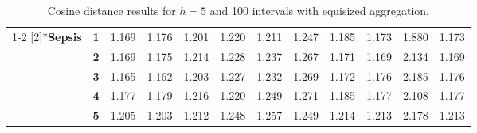 \begin{table}[htbp]
\begin{tabular}{|cl|rrrrrrrrrr|}
\cmidrule{1-2}    \multirow{5}[2]{*}{\textbf{Sepsis}} & \textbf{1} & \cellcolor[rgb]{ .851,  .851,  .851}1.169 & \cellcolor[rgb]{ .851,  .851,  .851}1.176 & \cellcolor[rgb]{ .847,  .847,  .847}1.201 & \cellcolor[rgb]{ .843,  .843,  .843}1.220 & \cellcolor[rgb]{ .843,  .843,  .843}1.211 & \cellcolor[rgb]{ .835,  .835,  .835}1.247 & \cellcolor[rgb]{ .847,  .847,  .847}1.185 & \cellcolor[rgb]{ .851,  .851,  .851}1.173 & \cellcolor[rgb]{ .714,  .714,  .714}1.880 & \cellcolor[rgb]{ .851,  .851,  .851}1.173 \\
          & \textbf{2} & \cellcolor[rgb]{ .851,  .851,  .851}1.169 & \cellcolor[rgb]{ .851,  .851,  .851}1.175 & \cellcolor[rgb]{ .843,  .843,  .843}1.214 & \cellcolor[rgb]{ .839,  .839,  .839}1.228 & \cellcolor[rgb]{ .839,  .839,  .839}1.237 & \cellcolor[rgb]{ .831,  .831,  .831}1.267 & \cellcolor[rgb]{ .851,  .851,  .851}1.171 & \cellcolor[rgb]{ .851,  .851,  .851}1.169 & \cellcolor[rgb]{ .663,  .663,  .663}2.134 & \cellcolor[rgb]{ .851,  .851,  .851}1.169 \\
          & \textbf{3} & \cellcolor[rgb]{ .851,  .851,  .851}1.165 & \cellcolor[rgb]{ .851,  .851,  .851}1.162 & \cellcolor[rgb]{ .843,  .843,  .843}1.203 & \cellcolor[rgb]{ .839,  .839,  .839}1.227 & \cellcolor[rgb]{ .839,  .839,  .839}1.232 & \cellcolor[rgb]{ .831,  .831,  .831}1.269 & \cellcolor[rgb]{ .851,  .851,  .851}1.172 & \cellcolor[rgb]{ .851,  .851,  .851}1.176 & \cellcolor[rgb]{ .651,  .651,  .651}2.185 & \cellcolor[rgb]{ .851,  .851,  .851}1.176 \\
          & \textbf{4} & \cellcolor[rgb]{ .851,  .851,  .851}1.177 & \cellcolor[rgb]{ .851,  .851,  .851}1.179 & \cellcolor[rgb]{ .843,  .843,  .843}1.216 & \cellcolor[rgb]{ .843,  .843,  .843}1.220 & \cellcolor[rgb]{ .835,  .835,  .835}1.249 & \cellcolor[rgb]{ .831,  .831,  .831}1.271 & \cellcolor[rgb]{ .847,  .847,  .847}1.185 & \cellcolor[rgb]{ .851,  .851,  .851}1.177 & \cellcolor[rgb]{ .667,  .667,  .667}2.108 & \cellcolor[rgb]{ .851,  .851,  .851}1.177 \\
          & \textbf{5} & \cellcolor[rgb]{ .843,  .843,  .843}1.205 & \cellcolor[rgb]{ .843,  .843,  .843}1.203 & \cellcolor[rgb]{ .843,  .843,  .843}1.212 & \cellcolor[rgb]{ .835,  .835,  .835}1.248 & \cellcolor[rgb]{ .835,  .835,  .835}1.257 & \cellcolor[rgb]{ .835,  .835,  .835}1.249 & \cellcolor[rgb]{ .843,  .843,  .843}1.214 & \cellcolor[rgb]{ .843,  .843,  .843}1.213 & \cellcolor[rgb]{ .655,  .655,  .655}2.178 & \cellcolor[rgb]{ .843,  .843,  .843}1.213 \\
    \bottomrule
    \end{tabular}%
  \caption{Cosine distance results for $h=5$ and 100 intervals with equisized aggregation.}
  \label{tab:equisize_100}%
\end{table}%
